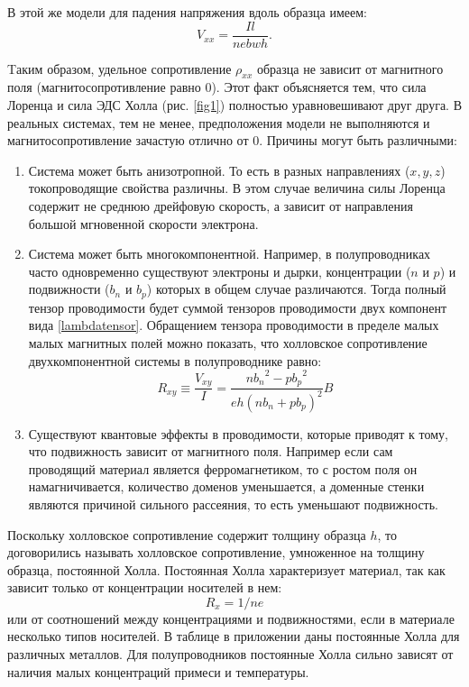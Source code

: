 В этой же модели для падения напряжения вдоль образца имеем:
\begin{equation}
V_{xx}=\frac{Il}{nebwh}.
\label{DiagonalVoltage}
\end{equation}

Tаким образом, удельное сопротивление $\rho_{xx}$ образца не зависит от магнитного поля (магнитосопротивление равно 0). Этот факт объясняется тем, что сила Лоренца и сила ЭДС Холла (рис. \ref{fig1}) полностью уравновешивают друг друга. В реальных системах, тем не менее, предположения модели не выполняются и магнитосопротивление зачастую отлично от 0. Причины могут быть различными:
\begin{enumerate}
\item{Система может быть анизотропной. То есть в разных направлениях ($x,y,z$) токопроводящие свойства различны. В этом случае величина силы Лоренца содержит не среднюю дрейфовую скорость, а зависит от направления большой мгновенной скорости электрона.}

\item{Система может быть многокомпонентной. Например, в полупроводниках часто одновременно существуют электроны и дырки, концентрации ($n$ и $p$) и подвижности ($b_n$ и $b_p$) которых в общем случае различаются. Тогда полный тензор проводимости будет суммой тензоров проводимости двух компонент вида \ref{lambdatensor}. Обращением тензора проводимости в пределе малых малых магнитных полей можно показать, что холловское сопротивление двухкомпонентной системы в полупроводнике равно:
      \begin{equation}
      R_{xy}\equiv \frac{V_{xy}}{I}=\frac{n{b_n}^2-p{b_p}^2}{eh(nb_n+pb_p)^2}B
      \label{halltwocomponents}
      \end{equation}
      }

\item{Существуют квантовые эффекты в проводимости, которые приводят к тому, что подвижность зависит от магнитного поля. Например если сам проводящий материал является ферромагнетиком, то с ростом поля он намагничивается, количество доменов уменьшается, а доменные стенки являются причиной сильного рассеяния, то есть уменьшают подвижность. }
\end{enumerate}

Поскольку холловское сопротивление содержит толщину образца $h$, то договорились называть холловское сопротивление, умноженное на толщину образца, постоянной Холла. Постоянная Холла характеризует материал, так как зависит только от концентрации носителей в нем:
$$
R_x=1/ne
$$
 или от соотношений между концентрациями и подвижностями, если в материале несколько типов носителей. В таблице в приложении даны постоянные Холла для различных металлов. Для полупроводников постоянные Холла сильно зависят от наличия малых концентраций примеси и температуры.

